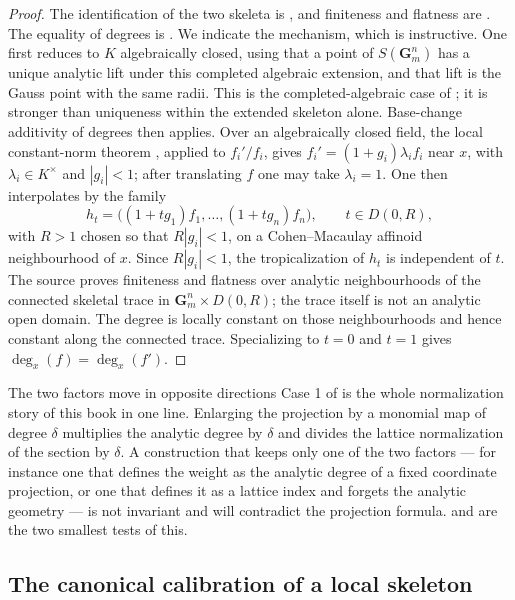\begin{proof}
The identification of the two skeleta is
, and finiteness and flatness are
. The equality of degrees is
\cite[Theorem~14.2.7]{CLD25}. We indicate the mechanism, which is
instructive. One first reduces to $K$ algebraically closed, using that a
point of $S(\mathbf G_m^n)$ has a unique analytic lift under this completed
algebraic extension, and that lift is the Gauss point with the same
radii. This is the completed-algebraic case of
\cite[Proposition~12.7.2]{CLD25}; it is stronger than uniqueness within the
extended skeleton alone. Base-change additivity of degrees then applies.
Over an algebraically closed field, the local
constant-norm theorem \cite[Proposition~12.2.12]{CLD25}, applied to
$f_i'/f_i$, gives
$f_i'=(1+g_i)\lambda_if_i$ near $x$, with $\lambda_i\in K^\times$ and $|g_i|<1$; after
translating $f$ one may take $\lambda_i=1$. One then interpolates by the
family
\[
 h_t=\bigl((1+tg_1)f_1,\ldots,(1+tg_n)f_n\bigr),\qquad t\in D(0,R),
\]
with $R>1$ chosen so that $R|g_i|<1$, on a Cohen--Macaulay affinoid
neighbourhood of $x$. Since $R|g_i|<1$, the tropicalization of $h_t$ is
independent of $t$. The source proves finiteness and flatness over analytic
neighbourhoods of the connected skeletal trace in
$\mathbf G_m^n\times D(0,R)$; the trace itself is not an analytic open
domain. The degree is locally constant on those neighbourhoods and hence
constant along the connected trace. Specializing to $t=0$ and $t=1$ gives
$\deg_x(f)=\deg_x(f')$.
\end{proof}

\begin{warning}{The two factors move in opposite directions}
Case 1 of  is the whole normalization
story of this book in one line. Enlarging the projection by a monomial map of
degree $\delta$ multiplies the analytic degree by $\delta$ and divides the
lattice normalization of the section by $\delta$. A construction that keeps
only one of the two factors --- for instance one that defines the weight as
the analytic degree of a fixed coordinate projection, or one that defines it
as a lattice index and forgets the analytic geometry --- is not invariant and
will contradict the projection formula.  and
 are the two smallest tests of this.
\end{warning}

\subsection{The canonical calibration of a local skeleton}

